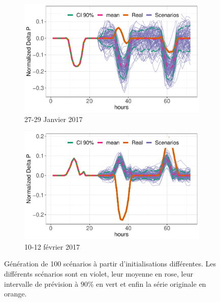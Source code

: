 \documentclass[12pt, french]{report}
\begin{document}
\begin{figure}[htbp]
\begin{center}
 		\begin{subfigure}[b]{0.5\linewidth}
 			\centering
 			\includegraphics[width = 0.9 \linewidth]{Images/PV/SARIMA/27.pdf}
 			\caption{27-29 Janvier 2017}
 		\end{subfigure}%
 		\begin{subfigure}[b]{0.5\linewidth}
 			\centering
 			\includegraphics[width = 0.9 \linewidth]{Images/PV/SARIMA/41.pdf}
 			\caption{10-12 février 2017}
 		\end{subfigure}
 	\end{center}
 	
 	\caption{Génération de 100 scénarios à partir d'initialisations différentes. Les différents scénarios sont en violet, leur moyenne en rose, leur intervalle de prévision à $90\%$ en vert et enfin la série originale en orange.}
 	\label{fig:PV_SARIMA_Scenarios} 
\end{figure}
\end{document}

